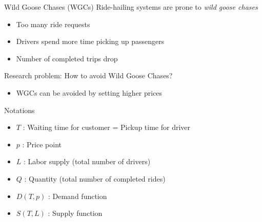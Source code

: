     \begin{frame}{Wild Goose Chases (WGCs)}
    Ride-hailing systems are prone to \textit{wild goose chases}
    \pause
    \begin{itemize}
        \item Too many ride requests
        \item Drivers spend more time picking up passengers
        \item Number of completed trips drop
    \end{itemize}
    \pause
    \pause
    \pause
    Research problem: How to avoid Wild Goose Chases?
    \pause
    \begin{itemize}
        \item WGCs can be avoided by setting higher prices
    \end{itemize}
    \end{frame}

    \begin{frame}{Notations}
    	\begin{itemize}
    		\item $T$ : Waiting time for customer = Pickup time for driver
    		\pause
    		\item $p$ : Price point
    		\pause
    		\item $L$ : Labor supply (total number of drivers)
    		\pause
    		\item $Q$ : Quantity (total number of completed rides)
    		\pause
    		\item $D(T, p)$ : Demand function
    		\pause
    		\item $S(T, L)$ : Supply function
    	\end{itemize}
    \end{frame}

